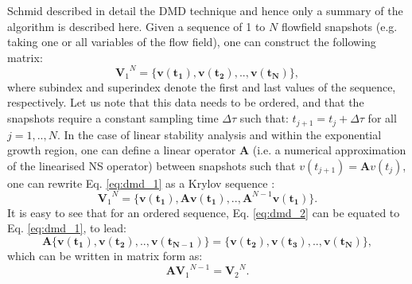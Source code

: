 \documentclass[a4paper,conference]{IEEEtran}
\begin{document}
Schmid \cite{DMDSchmid} described in detail the DMD technique and hence only a summary of the algorithm is described here. Given a sequence of 1 to $N$ flowfield snapshots (e.g. taking one or all variables of the flow field), one can construct the following matrix:
\begin{equation}\label{eq:dmd_1}
 {\mathbf{V}_1}^N=\{\mathbf{v(t_1)},\mathbf{v(t_2)},..,\mathbf{v(t_N)}\},
 \end{equation}
 where subindex and superindex denote the first and last values of the sequence, respectively.
  Let us note that this data needs to be ordered, and that the snapshots require a constant sampling time $\Delta\tau$ such that: $t_{j+1}=t_j+\Delta\tau$ for all $j=1,..,N$. In the case of linear stability analysis and within the exponential growth region, one can define a linear operator $\mathbf{A}$ (i.e. a numerical approximation of the linearised NS operator)  between snapshots such that $v(t_{j+1})=\mathbf{A}v(t_j)$, one can rewrite Eq. \ref{eq:dmd_1} as a Krylov sequence \cite{Saad:92}:
 \begin{equation}\label{eq:dmd_2}
 {\mathbf{V}_1}^N=\{\mathbf{v(t_1)},\mathbf{A}\mathbf{v(t_1)},..,\mathbf{A}^{N-1}\mathbf{v(t_1)}\}.%
 \end{equation}
   It is easy to see that for an ordered sequence, Eq. \ref{eq:dmd_2} can be equated to Eq. \ref{eq:dmd_1}, to lead:
  \begin{equation}\label{eq:dmd_2bis}
  \mathbf{A}\{\mathbf{v(t_1)},\mathbf{v(t_2)},..,\mathbf{v(t_{N-1})}\}=\{\mathbf{v(t_2)},\mathbf{v(t_3)},..,\mathbf{v(t_N)}\},
 \end{equation}
 which can be written in matrix form as:
  \begin{equation}\label{eq:dmd_3}
   \mathbf{A}{\mathbf{V}_1}^{N-1}={\mathbf{V}_2}^{N}.
  \end{equation}
%
\end{document}

